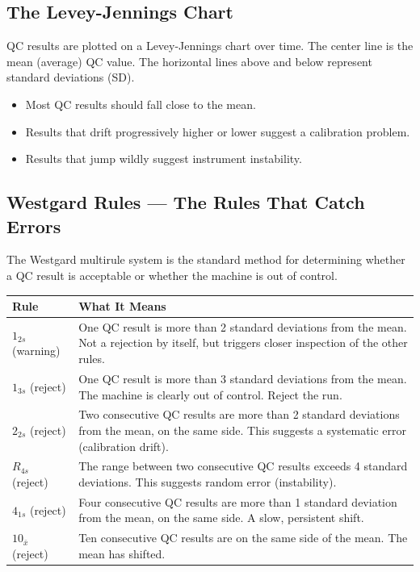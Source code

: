 \subsection{The Levey-Jennings Chart}

QC results are plotted on a Levey-Jennings chart over time. The center line is the mean (average) QC value. The horizontal lines above and below represent standard deviations (SD).

\begin{itemize}
    \item Most QC results should fall close to the mean.
    \item Results that drift progressively higher or lower suggest a calibration problem.
    \item Results that jump wildly suggest instrument instability.
\end{itemize}

\subsection{Westgard Rules --- The Rules That Catch Errors}

The Westgard multirule system is the standard method for determining whether a QC result is acceptable or whether the machine is out of control.

\begin{longtable}{@{}p{2.5cm}p{12.5cm}@{}}
\toprule
\textbf{Rule} & \textbf{What It Means} \\
\midrule
$1_{2s}$ (warning) & One QC result is more than 2 standard deviations from the mean. Not a rejection by itself, but triggers closer inspection of the other rules. \\
$1_{3s}$ (reject) & One QC result is more than 3 standard deviations from the mean. The machine is clearly out of control. Reject the run. \\
$2_{2s}$ (reject) & Two consecutive QC results are more than 2 standard deviations from the mean, on the same side. This suggests a systematic error (calibration drift). \\
$R_{4s}$ (reject) & The range between two consecutive QC results exceeds 4 standard deviations. This suggests random error (instability). \\
$4_{1s}$ (reject) & Four consecutive QC results are more than 1 standard deviation from the mean, on the same side. A slow, persistent shift. \\
$10_{\bar{x}}$ (reject) & Ten consecutive QC results are on the same side of the mean. The mean has shifted. \\
\bottomrule
\end{longtable}

